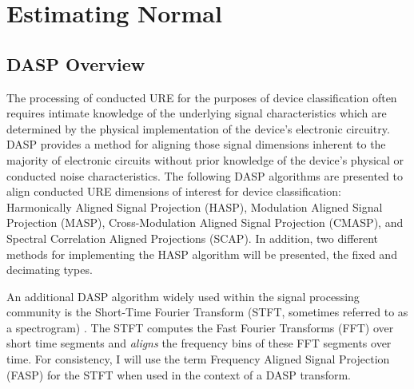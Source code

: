
\chapter{Estimating Normal}
\label{Estimating Normal Chapter}

\section[DASP Overview]{DASP Overview}

The processing of conducted URE for the purposes of device classification often requires intimate knowledge of the underlying signal characteristics which are determined by the physical implementation of the device's electronic circuitry.  DASP provides a method for aligning those signal dimensions inherent to the majority of electronic circuits without prior knowledge of the device's physical or conducted noise characteristics.  The following DASP algorithms are presented to align conducted URE dimensions of interest for device classification: Harmonically Aligned Signal Projection (HASP), Modulation Aligned Signal Projection (MASP), Cross-Modulation Aligned Signal Projection (CMASP), and Spectral Correlation Aligned Projections (SCAP).   In addition, two different methods for implementing the HASP algorithm will be presented, the fixed and decimating types.

An additional DASP algorithm widely used within the signal processing community is the Short-Time Fourier Transform (STFT, sometimes referred to as a spectrogram) \cite{Welch1967, Allen1977, Griffin1984}.  The STFT computes the Fast Fourier Transforms (FFT) over short time segments and \textit{aligns} the frequency bins of these FFT segments over time.  For consistency, I will use the term Frequency Aligned Signal Projection (FASP) for the STFT when used in the context of a DASP transform.   


